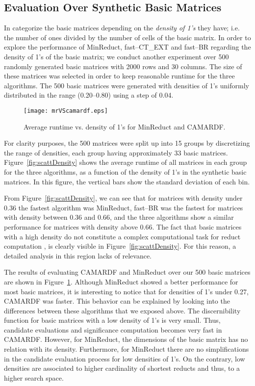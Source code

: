 \documentclass[authoryear,preprint,review,12pt]{elsarticle}
\begin{document}
\subsection{Evaluation Over Synthetic Basic Matrices}\label{sub:synth}

	In \citep{Rodriguez2017} categorize the basic matrices depending on the \emph{density of 1's} they have; i.e. the number of ones divided by the number of cells of the basic matrix. In order to explore the performance of MinReduct, fast--CT\_EXT and fast--BR regarding the density of 1's of the basic matrix; we conduct another experiment over 500 randomly generated basic matrices with 2000 rows and 30 columns. The size of these matrices was selected in order to keep reasonable runtime for the three algorithms. The 500 basic matrices were generated with densities of 1's uniformly distributed in the range (0.20--0.80) using a step of 0.04. 
				
	\begin{figure}[htb]
		\begin{center}
			\texttt{[image: mrVScamardf.eps]}
		\end{center}
		\caption{Average runtime vs. density of 1's for MinReduct and CAMARDF.}
		\label{fig:camardf}
	\end{figure}	

	For clarity purposes, the 500 matrices were split up into 15 groups by discretizing the range of densities, each group having approximately 33 basic matrices. Figure~\ref{fig:scattDensity} shows the average runtime of all  matrices in each group for the three algorithms, as a function of the density of 1's in the synthetic basic matrices. In this figure, the vertical bars show the standard deviation of each bin. 
		
	From Figure~\ref{fig:scattDensity}, we can see that for matrices with density under 0.36  the fastest algorithm was MinReduct, fast--BR was the fastest for matrices with density between 0.36 and 0.66, and the three algorithms show a similar performance for matrices with density above 0.66. The fact that basic matrices with a high density do not constitute a complex computational task for reduct computation \citep{Rojas12}, is clearly visible in Figure~\ref{fig:scattDensity}. For this reason, a detailed analysis in this region lacks of relevance.
		
	The results of evaluating CAMARDF and MinReduct over our 500 basic matrices are shown in Figure~\ref{fig:camardf}. Although MinReduct showed a better performance for most basic matrices, it is interesting to notice that for densities of 1's under 0.27, CAMARDF was faster. This behavior can be explained by looking into the differences between these algorithms that we exposed above. The discernibility function for basic matrices with a low density of 1's is very small. Thus, candidate evaluations and significance computation becomes very fast in CAMARDF. However, for MinReduct, the dimensions of the basic matrix has no relation with its density. Furthermore, for MinReduct there are no simplifications in the candidate evaluation process for low densities of 1's. On the contrary, low densities are associated to higher cardinality of shortest reducts and thus, to a higher search space.
	
\end{document}
